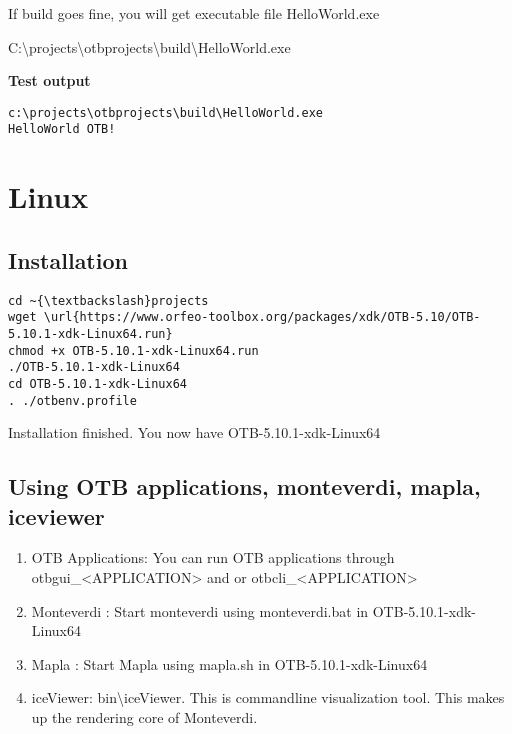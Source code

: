 \documentclass[10pt,a4paper]{article}
\begin{document}
If build goes fine, you will get executable file HelloWorld.exe
\newline

C:{\textbackslash}projects{\textbackslash}otbprojects{\textbackslash}build{\textbackslash}HelloWorld.exe

\newline
\textbf{Test output}

\begin{verbatim}
c:\projects\otbprojects\build\HelloWorld.exe
HelloWorld OTB!
\end{verbatim}






\section{Linux}

\subsection{Installation}

\begin{verbatim}
cd ~{\textbackslash}projects
wget \url{https://www.orfeo-toolbox.org/packages/xdk/OTB-5.10/OTB-5.10.1-xdk-Linux64.run}
chmod +x OTB-5.10.1-xdk-Linux64.run
./OTB-5.10.1-xdk-Linux64
cd OTB-5.10.1-xdk-Linux64
. ./otbenv.profile
\end{verbatim}

Installation finished. You now have OTB-5.10.1-xdk-Linux64

\subsection{Using OTB applications, monteverdi, mapla, iceviewer}
\begin{enumerate}
\item OTB Applications: You can run OTB applications through otbgui\_<APPLICATION> and or otbcli\_<APPLICATION> 
\item Monteverdi : Start monteverdi using monteverdi.bat in OTB-5.10.1-xdk-Linux64
\item Mapla : Start Mapla using mapla.sh in OTB-5.10.1-xdk-Linux64
\item iceViewer: bin{\textbackslash}iceViewer. This is commandline visualization tool. This makes up the rendering core of Monteverdi.
\end{enumerate}
\end{document}
